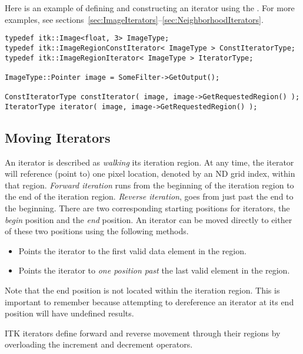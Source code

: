 Here is an example of defining and constructing an iterator using the
.  For more examples, see
sections~\ref{sec:ImageIterators}--\ref{sec:NeighborhoodIterators}.

\small
\begin{verbatim}
typedef itk::Image<float, 3> ImageType;
typedef itk::ImageRegionConstIterator< ImageType > ConstIteratorType;
typedef itk::ImageRegionIterator< ImageType > IteratorType;

ImageType::Pointer image = SomeFilter->GetOutput();

ConstIteratorType constIterator( image, image->GetRequestedRegion() );
IteratorType iterator( image, image->GetRequestedRegion() );
\end{verbatim}
\normalsize

\subsection{Moving Iterators}
\label{sec:MovingIterators}
An iterator is described as \emph{walking} its iteration region.  At any time,
the iterator will reference (point to) one pixel location, denoted by an ND
grid index, within that region. \emph{Forward iteration} runs from the beginning of the iteration
region to the end of the iteration region.  \emph{Reverse iteration},
goes from just past the end to the beginning.  There are two
corresponding starting positions for iterators, the \emph{begin} position and
the \emph{end} position.  An iterator can be moved directly to either of these
two positions using the following methods.


\begin{itemize}
\item \textbf{} Points the iterator to the first valid
data element in the region.

\item \textbf{} Points the iterator to \emph{one position past}
the last valid element in the region.
\end{itemize}

Note that the end position is not located within the iteration region.  This is
important to remember because attempting to dereference an iterator at its end
position will have undefined results.

ITK iterators define forward and reverse movement through their regions by
overloading the increment and decrement operators.

